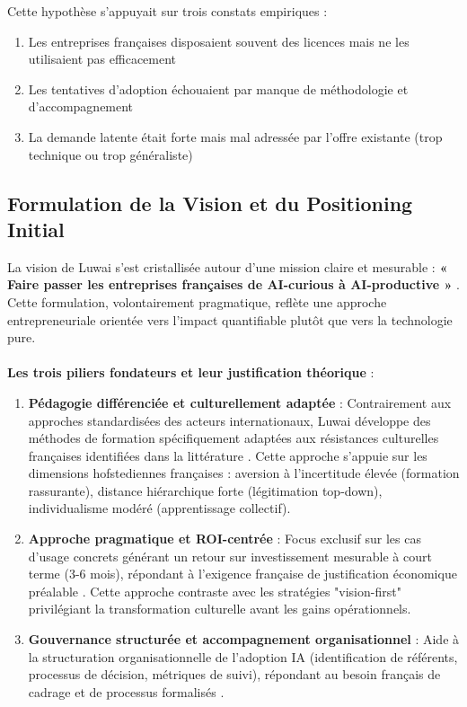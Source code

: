 Cette hypothèse s'appuyait sur trois constats empiriques :
\begin{enumerate}
    \item Les entreprises françaises disposaient souvent des licences mais ne les utilisaient pas efficacement
    \item Les tentatives d'adoption échouaient par manque de méthodologie et d'accompagnement
    \item La demande latente était forte mais mal adressée par l'offre existante (trop technique ou trop généraliste)
\end{enumerate}

\subsection{Formulation de la Vision et du Positioning Initial}

La vision de Luwai s'est cristallisée autour d'une mission claire et mesurable : \textbf{« Faire passer les entreprises françaises de AI-curious à AI-productive »} \cite{luwai2024vision}. Cette formulation, volontairement pragmatique, reflète une approche entrepreneuriale orientée vers l'impact quantifiable plutôt que vers la technologie pure.
\\\\
\textbf{Les trois piliers fondateurs et leur justification théorique} :

\begin{enumerate}
    \item \textbf{Pédagogie différenciée et culturellement adaptée} : Contrairement aux approches standardisées des acteurs internationaux, Luwai développe des méthodes de formation spécifiquement adaptées aux résistances culturelles françaises identifiées dans la littérature \cite{meyer2014culture}. Cette approche s'appuie sur les dimensions hofstediennes françaises : aversion à l'incertitude élevée (formation rassurante), distance hiérarchique forte (légitimation top-down), individualisme modéré (apprentissage collectif).

    \item \textbf{Approche pragmatique et ROI-centrée} : Focus exclusif sur les cas d'usage concrets générant un retour sur investissement mesurable à court terme (3-6 mois), répondant à l'exigence française de justification économique préalable \cite{anthony2020planning}. Cette approche contraste avec les stratégies "vision-first" privilégiant la transformation culturelle avant les gains opérationnels.

    \item \textbf{Gouvernance structurée et accompagnement organisationnel} : Aide à la structuration organisationnelle de l'adoption IA (identification de référents, processus de décision, métriques de suivi), répondant au besoin français de cadrage et de processus formalisés \cite{bureaucracy2024france}.
\end{enumerate}

